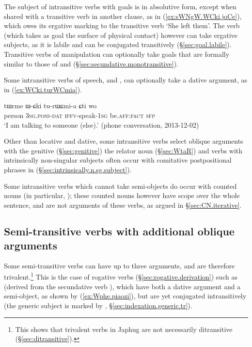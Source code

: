 The subject of intransitive verbs with goals is in absolutive form, except when shared with a transitive verb in another clause, as  in (\ref{ex:sWNgW.WCki.joCe}), which owes its ergative marking to the transitive verb  `She left them'. The verb  (which takes as goal the surface of physical contact) however can take ergative subjects, as it is labile and can be conjugated transitively (§\ref{sec:goal.labile}). Transitive verbs of manipulation can optionally take goals that are formally similar to those of  and  (§\ref{sec:secundative.monotransitive}).

Some intransitive verbs of speech,  and , can optionally take a dative argument, as in (\ref{ex:WCki.turWCmia}).

\begin{exe}
\ex   \label{ex:WCki.turWCmia}
 \gll tɯrme ɯ-ɕki tu-rɯɕmi-a ɕti wo \\
 person \textsc{3sg}.\textsc{poss}-\textsc{dat} \textsc{ipfv}-speak-\textsc{1sg} be.\textsc{aff}:\textsc{fact} \textsc{sfp} \\
\glt `I am talking to someone (else).' (phone conversation, 2013-12-02)
\end{exe}

Other than locative and dative, some intransitive verbs select oblique arguments with the genitive (§\ref{sec:genitive}) the relator noun  (§\ref{sec:WtaR}) and verbs with intrinsically non-singular subjects often occur with comitative postpositional phrases in  (§\ref{sec:intrinsically.n.sg.subject}).

Some intransitive verbs which cannot take semi-objects do occur with counted nouns (in particular, ); these counted nouns however have scope over the whole sentence, and are not arguments of these verbs, as argued in §\ref{sec:CN.iterative}. 

\subsection{Semi-transitive verbs with additional oblique arguments} \label{sec:semi.transitive.dative}
Some semi-transitive verbs can have up to three arguments, and are therefore trivalent.\footnote{
This shows that trivalent verbs in Japhug are not necessarily ditransitive (§\ref{sec:ditransitive}).
} This is the case of rogative verbs (§\ref{sec:rogative.derivation}) such as  (derived from the secundative verb ), which have both a dative argument and a semi-object, as shown by (\ref{ex:Wphe.piaozi}), but are yet conjugated intransitively (the generic subject is marked by , §\ref{sec:indexation.generic.tr}).


